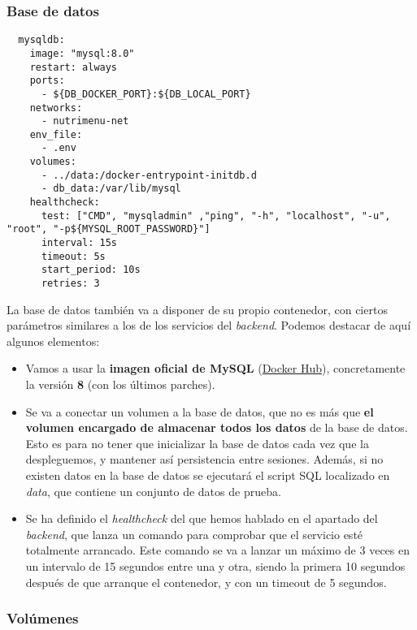 \subsubsection{Base de datos}

\begin{lstlisting}
  mysqldb:
    image: "mysql:8.0"
    restart: always
    ports:
      - ${DB_DOCKER_PORT}:${DB_LOCAL_PORT}
    networks:
      - nutrimenu-net
    env_file:
      - .env
    volumes:
      - ../data:/docker-entrypoint-initdb.d
      - db_data:/var/lib/mysql
    healthcheck:
      test: ["CMD", "mysqladmin" ,"ping", "-h", "localhost", "-u", "root", "-p${MYSQL_ROOT_PASSWORD}"]
      interval: 15s
      timeout: 5s
      start_period: 10s
      retries: 3
\end{lstlisting}

La base de datos también va a disponer de su propio contenedor, con ciertos parámetros similares a los de los servicios del \textit{backend}. Podemos destacar de aquí algunos elementos:

\begin{itemize}
	\item Vamos a usar la \textbf{imagen oficial de MySQL} (\href{https://hub.docker.com/layers/library/mysql/8/images/sha256-1717a37c2adc7772b569eb727bb198b6792f7d50c2adb4839ba637b5c9d88f42?context=explore}{Docker Hub}), concretamente la versión \textbf{8} (con los últimos parches). 
	\item Se va a conectar un volumen a la base de datos, que no es más que \textbf{el volumen encargado de almacenar todos los datos} de la base de datos. Esto es para no tener que inicializar la base de datos cada vez que la despleguemos, y mantener así persistencia entre sesiones. Además, si no existen datos en la base de datos se ejecutará el script SQL localizado en \textit{data}, que contiene un conjunto de datos de prueba.
	\item Se ha definido el \textit{healthcheck} del que hemos hablado en el apartado del \textit{backend}, que lanza un comando para comprobar que el servicio esté totalmente arrancado. Este comando se va a lanzar un máximo de 3 veces en un intervalo de 15 segundos entre una y otra, siendo la primera 10 segundos después de que arranque el contenedor, y con un timeout de 5 segundos.
\end{itemize} 

\subsubsection{Volúmenes}

